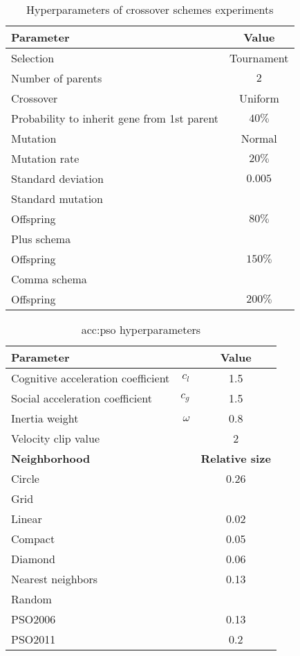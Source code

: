 \begin{table}[h]
    \centering
    \begin{tabular}{|l|c|}
        \hline
        \textbf{Parameter} & \textbf{Value} \\
        \hline
        Selection & Tournament \\
        \quad Number of parents & $2$ \\
        Crossover & Uniform \\
        \quad Probability to inherit gene from 1st parent & $40\%$ \\
        Mutation & Normal \\
        \quad Mutation rate & $20\%$ \\
        \quad Standard deviation & $0.005$ \\
        \hline
        Standard mutation & \\
        \quad Offspring & $80\%$ \\
        Plus schema & \\
        \quad Offspring & $150\%$ \\
        Comma schema & \\
        \quad Offspring & $200\%$ \\
        \hline
    \end{tabular}
    \caption{Hyperparameters of crossover schemes experiments}
    \label{tab:esschemehyperparmarameters}
\end{table}

\begin{table}[h]
    \centering
    \begin{tabular}{|l r|c|}
        \hline
        \multicolumn{2}{|l|}{\textbf{Parameter}} & \textbf{Value} \\
        \hline
        Cognitive acceleration coefficient & $c_l$ & 1.5 \\
        Social acceleration coefficient  & $c_g$ & 1.5 \\
        Inertia weight & $\omega$ & 0.8 \\
        Velocity clip value & & 2 \\
        \hline \hline
        \textbf{Neighborhood} & & \textbf{Relative size} \\
        \hline
        Circle & & 0.26 \\
        Grid & & \\
        \quad Linear & & 0.02 \\
        \quad Compact & & 0.05 \\
        \quad Diamond & & 0.06 \\
        Nearest neighbors & & 0.13 \\
        Random & & \\
        \quad PSO2006 & & 0.13 \\
        \quad PSO2011 & & 0.2 \\ 
        \hline
    \end{tabular}
    \caption{\acrlong*{acc:pso} hyperparameters}
    \label{tab:psohyperparameters}
\end{table}
